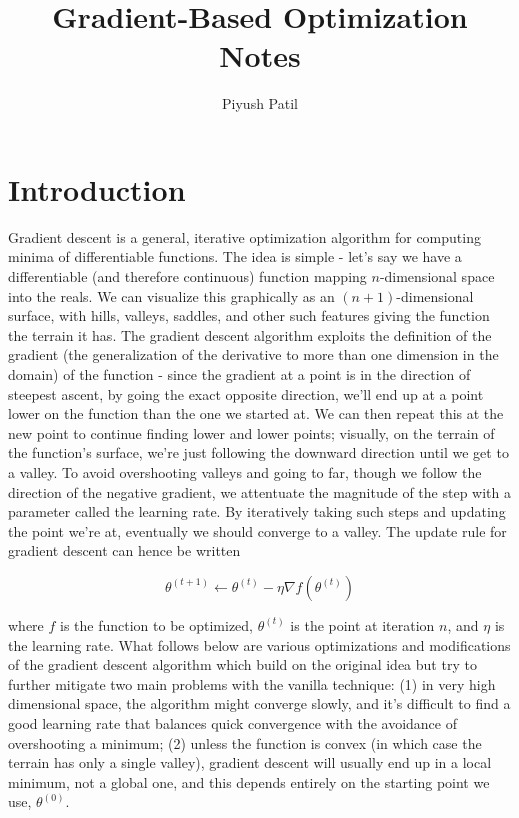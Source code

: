 \documentclass{article}
\begin{document}
\title{Gradient-Based Optimization Notes}
\author{Piyush Patil}
\maketitle

\section{Introduction}
Gradient descent is a general, iterative optimization algorithm for computing minima of differentiable functions. The idea is simple - let's say we have a differentiable (and therefore continuous) function mapping $ n $-dimensional space into the reals. We can visualize this graphically as an $ (n + 1) $-dimensional surface, with hills, valleys, saddles, and other such features giving the function the terrain it has. The gradient descent algorithm exploits the definition of the gradient (the generalization of the derivative to more than one dimension in the domain) of the function - since the gradient at a point is in the direction of steepest ascent, by going the exact opposite direction, we'll end up at a point lower on the function than the one we started at. We can then repeat this at the new point to continue finding lower and lower points; visually, on the terrain of the function's surface, we're just following the downward direction until we get to a valley. To avoid overshooting valleys and going to far, though we follow the direction of the negative gradient, we attentuate the magnitude of the step with a parameter called the learning rate. By iteratively taking such steps and updating the point we're at, eventually we should converge to a valley. The update rule for gradient descent can hence be written

    $$ \theta^{(t + 1)} \gets \theta^{(t)} - \eta \nabla f(\theta^{(t)}) $$

where $ f $ is the function to be optimized, $ \theta^{(t)} $ is the point at iteration $ n $, and $ \eta $ is the learning rate. What follows below are various optimizations and modifications of the gradient descent algorithm which build on the original idea but try to further mitigate two main problems with the vanilla technique: (1) in very high dimensional space, the algorithm might converge slowly, and it's difficult to find a good learning rate that balances quick convergence with the avoidance of overshooting a minimum; (2) unless the function is convex (in which case the terrain has only a single valley), gradient descent will usually end up in a local minimum, not a global one, and this depends entirely on the starting point we use, $ \theta^{(0)} $.
\end{document}
